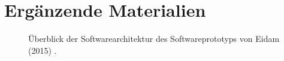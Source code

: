 \chapter{Ergänzende Materialien}
\label{chapter:ergabb}

\begin{figure}[ht]
\begin{minipage}[t]{\linewidth} 
      \centering 
{}
\caption{Überblick der Softwarearchitektur des Softwareprototyps von Eidam (2015) \cite[S.69]{Eidam2015}.}
\label{fig:eidambild}
   \end{minipage}%
\end{figure}

